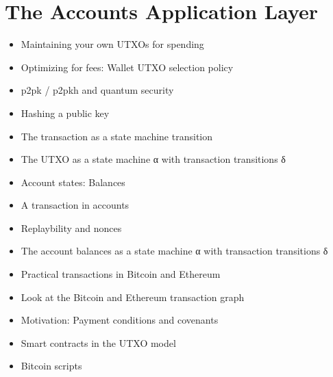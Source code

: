 \chapter{The Accounts Application Layer}

{\color{red}
\begin{itemize}
\item Maintaining your own UTXOs for spending
\item Optimizing for fees: Wallet UTXO selection policy
\item p2pk / p2pkh and quantum security
\item Hashing a public key
\item The transaction as a state machine transition
\item The UTXO as a state machine α with transaction transitions δ
\item Account states: Balances
\item A transaction in accounts
\item Replaybility and nonces
\item The account balances as a state machine α with transaction transitions δ
\item Practical transactions in Bitcoin and Ethereum
\item Look at the Bitcoin and Ethereum transaction graph
\item Motivation: Payment conditions and covenants
\item Smart contracts in the UTXO model
\item Bitcoin scripts
\end{itemize}
}
